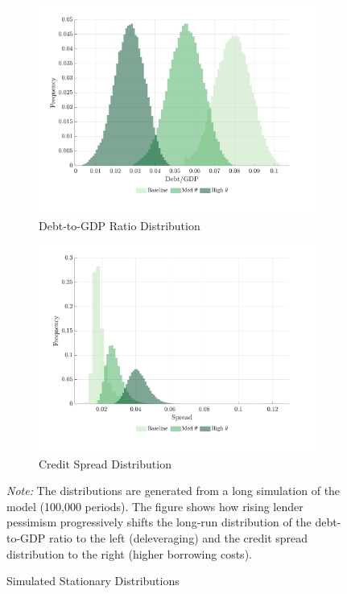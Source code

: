 \documentclass[12pt]{article}
\theoremstyle{plain}
\begin{document}
\begin{figure}[h!]
	\centering
	\begin{subfigure}[b]{0.48\textwidth}
		\centering
		\includegraphics[width=\textwidth]{../../pessimism-default-model/results/comparison_figure_7.pdf}
		\caption{Debt-to-GDP Ratio Distribution}
		\label{fig:dist_debt}
	\end{subfigure}
	\hfill
	\begin{subfigure}[b]{0.48\textwidth}
		\centering
		\includegraphics[width=\textwidth]{../../pessimism-default-model/results/comparison_figure_6.pdf}
		\caption{Credit Spread Distribution}
		\label{fig:dist_spread}
	\end{subfigure}
	\caption{Simulated Stationary Distributions}
	\label{fig:sim_distributions}
	\parbox{\linewidth}{\small\textit{Note:} The distributions are generated from a long simulation of the model (100,000 periods). The figure shows how rising lender pessimism progressively shifts the long-run distribution of the debt-to-GDP ratio to the left (deleveraging) and the credit spread distribution to the right (higher borrowing costs).}
\end{figure}
\end{document}
